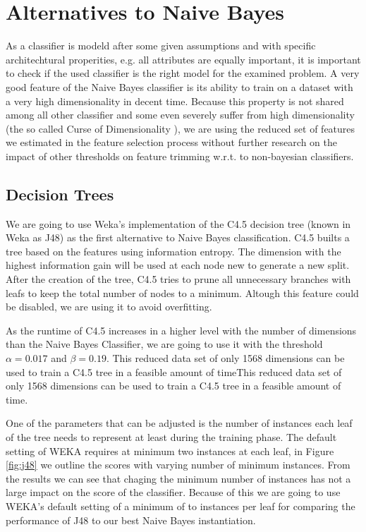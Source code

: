 \section{Alternatives to Naive Bayes}
As a classifier is modeld after some given assumptions and with specific architechtural properities, e.g. all attributes are equally important, it is important to check if the used classifier is the right model for the examined problem.
A very good feature of the Naive Bayes classifier is its ability to train on a dataset with a very high dimensionality in decent time.
Because this property is not shared among all other classifier and some even severely suffer from high dimensionality (the so called Curse of Dimensionality \cite{bellman1957dynamic}), we are using the reduced set of features we estimated in the feature selection process without further research on the impact of other thresholds on feature trimming w.r.t. to non-bayesian classifiers.

\subsection{Decision Trees}

We are going to use Weka's \cite{hall2009weka} implementation of the C4.5 decision tree \cite{Quinlan1993} (known in Weka as J48) as the first alternative to Naive Bayes classification.
C4.5 builts a tree based on the features using information entropy.
The dimension with the highest information gain will be used at each node new to generate a new split.
After the creation of the tree, C4.5 tries to prune all unnecessary branches with leafs to keep the total number of nodes to a minimum.
Altough this feature could be disabled, we are using it to avoid overfitting.

As the runtime of C4.5 increases in a higher level with the number of dimensions than the Naive Bayes Classifier, we are going to use it with the threshold $\alpha=0.017$ and $\beta=0.19$.
This reduced data set of only 1568 dimensions can be used to train a C4.5 tree in a feasible amount of timeThis reduced data set of only 1568 dimensions can be used to train a C4.5 tree in a feasible amount of time.



One of the parameters that can be adjusted is the number of instances each leaf of the tree needs to represent at least during the training phase.
The default setting of WEKA requires at minimum two instances at each leaf, in Figure \ref{fig:j48} we outline the scores with varying number of minimum instances.
From the results we can see that chaging the minimum number of instances has not a large impact on the score of the classifier.
Because of this we are going to use WEKA's default setting of a minimum of to instances per leaf for comparing the performance of J48 to our best Naive Bayes instantiation.



